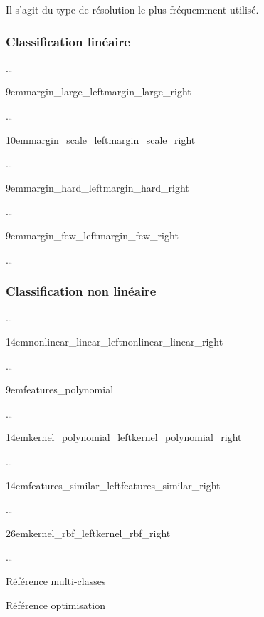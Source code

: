 Il s’agit du type de résolution le plus fréquemment utilisé.

\subsubsection{Classification linéaire}

…

{9em}{margin_large_left}{margin_large_right}

…

{10em}{margin_scale_left}{margin_scale_right}

…

{9em}{margin_hard_left}{margin_hard_right}

…

{9em}{margin_few_left}{margin_few_right}

…

\subsubsection{Classification non linéaire}

…

{14em}{nonlinear_linear_left}{nonlinear_linear_right}

…

{9em}{features_polynomial}

…

{14em}{kernel_polynomial_left}{kernel_polynomial_right}

…

{14em}{features_similar_left}{features_similar_right}

…

{26em}{kernel_rbf_left}{kernel_rbf_right}

…

Référence multi-classes \cite{multi-class}

Référence optimisation \cite{mri} \cite{optimization}

\pagebreak
